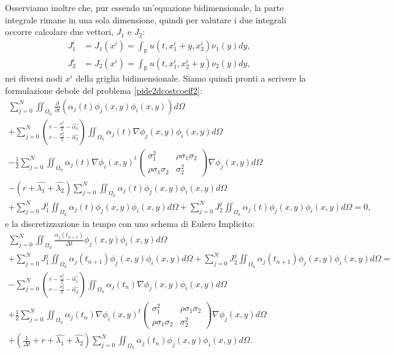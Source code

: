 \documentclass[a4paper,10pt]{report}
\theoremstyle{plain}
\theoremstyle{definition}
\theoremstyle{remark}
\begin{document}
Osserviamo inoltre che, pur essendo un'equazione bidimensionale, la parte integrale rimane in una sola dimensione, quindi per valutare i due integrali occorre calcolare due vettori, $J_1$ e $J_2$:
\begin{align*}
J_1^i&=J_1(x^i)=\int_\mathbb{R}u(t,x_1^i+y,x_2^i)\nu_1(y)dy,\\
J_2^i&=J_2(x^i)=\int_\mathbb{R}u(t,x_1^i,x_2^i+y)\nu_2(y)dy,
\end{align*}
nei diversi nodi $x^i$ della griglia bidimensionale. Siamo quindi pronti a scrivere la formulazione debole del problema \eqref{pide2dcostcoeff2}:
\begin{multline}
\sum_{j=0}^{N}\iint_{\Omega_h}\frac{\partial}{\partial t}\left(\alpha_j(t)\phi_j(x,y)\phi_i(x,y)\right)d\Omega\\
+\sum_{j=0}^{N}\binom{r-\frac{\sigma_1^2}{2}-\hat{\alpha_1}}{r-\frac{\sigma_2^2}{2}-\hat{\alpha_2}}\iint_{\Omega_h}\alpha_j(t)\nabla\phi_j(x,y)\phi_i(x,y)d\Omega\\
-\frac{1}{2}\sum_{j=0}^{N}\iint_{\Omega_h}\alpha_j(t)\nabla\phi_i(x,y)^t\left(\begin{matrix}\sigma_1^2 & \rho\sigma_1\sigma_2\\ \rho\sigma_1\sigma_2 & \sigma_2^2 \end{matrix}\right)\nabla\phi_j(x,y)d\Omega\\
-(r+\hat{\lambda_1}+\hat{\lambda_2})\sum_{j=0}^{N}\iint_{\Omega_h}\alpha_j(t)\phi_j(x,y)\phi_i(x,y)d\Omega\\
+\sum_{j=0}^{N}J^j_1\iint_{\Omega_h}\alpha_j(t)\phi_j(x,y)\phi_i(x,y)d\Omega+\sum_{j=0}^{N}J^j_2\iint_{\Omega_h}\alpha_j(t)\phi_j(x,y)\phi_i(x,y)d\Omega=0,
\end{multline}
e la discretizzazione in tempo con uno schema di Eulero Implicito:
\begin{multline}
\sum_{j=0}^{N}\iint_{\Omega_h}\frac{\alpha_j(t_{n+1})}{\Delta t}\phi_j(x,y)\phi_i(x,y)d\Omega\\
+\sum_{j=0}^{N}J^j_1\iint_{\Omega_h}\alpha_j(t_{n+1})\phi_j(x,y)\phi_i(x,y)d\Omega+\sum_{j=0}^{N}J^j_2\iint_{\Omega_h}\alpha_j(t_{n+1})\phi_j(x,y)\phi_i(x,y)d\Omega=\\
-\sum_{j=0}^{N}\binom{r-\frac{\sigma_1^2}{2}-\hat{\alpha_1}}{r-\frac{\sigma_2^2}{2}-\hat{\alpha_2}}\iint_{\Omega_h}\alpha_j(t_n)\nabla\phi_j(x,y)\phi_i(x,y)d\Omega\\
+\frac{1}{2}\sum_{j=0}^{N}\iint_{\Omega_h}\alpha_j(t_n)\nabla\phi_i(x,y)^t\left(\begin{matrix}\sigma_1^2 & \rho\sigma_1\sigma_2\\ \rho\sigma_1\sigma_2 & \sigma_2^2 \end{matrix}\right)\nabla\phi_j(x,y)d\Omega\\
+\left(\frac{1}{\Delta t}+r+\hat{\lambda_1}+\hat{\lambda_2}\right)\sum_{j=0}^{N}\iint_{\Omega_h}\alpha_j(t_n)\phi_j(x,y)\phi_i(x,y)d\Omega.
\end{multline}
\end{document}
